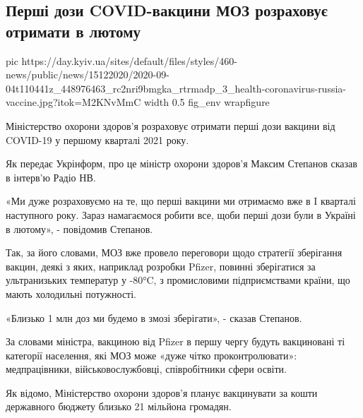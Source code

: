  
 
 
 
 
 
\subsection{Перші дози COVID-вакцини МОЗ розраховує отримати в лютому}
\label{sec:15_12_2020.news.ua.day_kiev_ua.1.vaccination_ukraina}

\ifcmt
  pic https://day.kyiv.ua/sites/default/files/styles/460-news/public/news/15122020/2020-09-04t110441z_448976463_rc2nri9bmgka_rtrmadp_3_health-coronavirus-russia-vaccine.jpg?itok=M2KNvMmC
  width 0.5
  fig_env wrapfigure
\fi


Міністерство охорони здоров’я розраховує отримати перші дози вакцини від
COVID-19 у першому кварталі 2021 року.

Як передає Укрінформ, про це міністр охорони здоров'я Максим Степанов сказав в
інтерв'ю Радіо НВ.

«Ми дуже розраховуємо на те, що перші вакцини ми отримаємо вже в I кварталі
наступного року. Зараз намагаємося робити все, щоби перші дози були в Україні в
лютому», - повідомив Степанов.

Так, за його словами, МОЗ вже провело переговори щодо стратегії зберігання
вакцин, деякі з яких, наприклад розробки Pfizer, повинні зберігатися за
ультранизьких температур у -80°C, з промисловими підприємствами країни, що
мають холодильні потужності.

«Близько 1 млн доз ми будемо в змозі зберігати», - сказав Степанов.

За словами міністра, вакциною від Pfizer в першу чергу будуть вакциновані ті
категорії населення, які МОЗ може «дуже чітко проконтролювати»: медпрацівники,
військовослужбовці, співробітники сфери освіти.

Як відомо, Міністерство охорони здоров'я планує вакцинувати за кошти державного
бюджету близько 21 мільйона громадян. 
